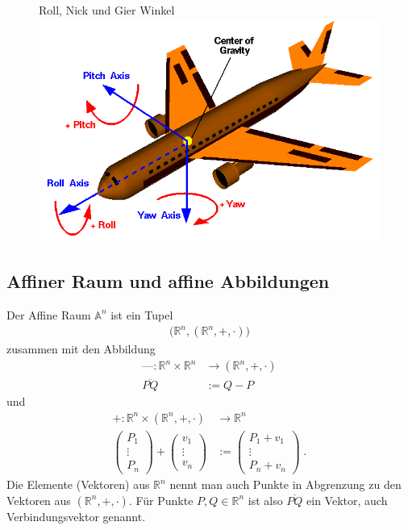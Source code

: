 \documentclass[]{article}
\begin{document}
\begin{figure}[H]
\centering
Roll, Nick und Gier Winkel \
\includegraphics[scale=0.6]{pitch.png}
\end{figure}

\subsection{Affiner Raum und affine Abbildungen}
Der Affine Raum $\mathbb{A}^n$ ist ein Tupel
\begin{align*}
\bigl( \mathbb{R}^n, (\mathbb{R}^n, + , \cdot ) \bigr )
\end{align*}
zusammen mit den Abbildung 
\begin{align*}
\text{---} : \mathbb{R}^n \times \mathbb{R}^n  & \to (\mathbb{R}^n, + , \cdot ) \\
\overline{PQ} & := Q-P  
\end{align*}
und
\begin{align*}
+ : \mathbb{R}^n \times (\mathbb{R}^n, + , \cdot )   & \to  \mathbb{R}^n\\
\begin{pmatrix}
P_1 \\ \vdots \\ P_n
\end{pmatrix} + \begin{pmatrix}
v_1 \\ \vdots \\ v_n
\end{pmatrix} & := \begin{pmatrix}
P_1  + v_1 \\ \vdots \\ P_n + v_n 
\end{pmatrix}   \;.
\end{align*}
Die Elemente (Vektoren) aus $\mathbb{R}^n$ nennt man auch  Punkte in Abgrenzung zu den Vektoren aus $(\mathbb{R}^n, + , \cdot )$.  
Für Punkte $P,Q \in \mathbb{R}^n$ ist also $\overline{PQ}$ ein Vektor, auch Verbindungsvektor genannt.
\end{document}
